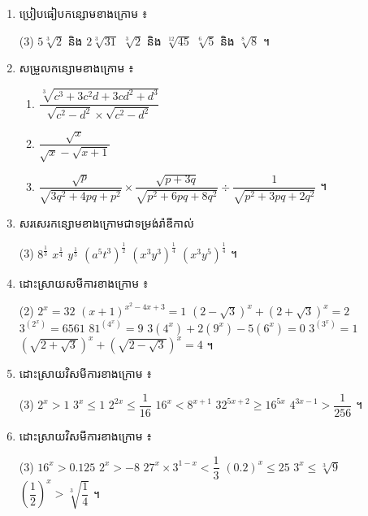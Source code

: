 \begin{enumerate}[1]
\begin{tasks}
  \end{tasks}
  \item ប្រៀបធៀបកន្សោមខាងក្រោម ៖
  \begin{tasks}(3)
    \task $5\sqrt[3]{2}$ និង $2\sqrt[3]{31}$
    \task $\sqrt[3]{2}$ និង $\sqrt[12]{45}$
    \task $\sqrt[6]{5}$ និង $\sqrt[8]{8}$ ។
  \end{tasks}
  \item សម្រួលកន្សោមខាងក្រោម ៖
  \begin{enumerate}[a]
    \item $\dfrac{\sqrt[3]{c^3 + 3c^2d + 3cd^2 + d^3}}{\sqrt{c^2 - d^2} \times \sqrt{c^2 - d^2}}$
    \item $\dfrac{\sqrt{x}}{\sqrt{x} - \sqrt{x + 1}}$
    \item $\dfrac{\sqrt{p}}{\sqrt{3q^2 + 4pq + p^2}} \times \dfrac{\sqrt{p + 3q}}{\sqrt{p^2 + 6pq + 8q^2}} \div \dfrac{1}{\sqrt{p^2 + 3pq + 2q^2}}$ ។
  \end{enumerate}
  \item សរសេរកន្សោមខាងក្រោមជាទម្រង់រ៉ាឌីកាល់
  \begin{tasks}(3)
    \task $8^{\frac{1}{3}}$
    \task $x^{\frac{1}{4}}$
    \task $y^{\frac{1}{5}}$
    \task $(a^5t^3)^{\frac{1}{2}}$
    \task $(x^3y^3)^{\frac{1}{4}}$
    \task $(x^3y^5)^{\frac{1}{4}}$ ។
  \end{tasks}
  \item ដោះស្រាយសមីការខាងក្រោម ៖
  \begin{tasks}(2)
    \task $2^x = 32$
    \task $(x + 1)^{x^2-4x+3} = 1$
    \task $(2 - \sqrt{3})^x + (2 + \sqrt{3})^x = 2$
    \task $3^{(2^x)} = 6561$
    \task $81^{(4^x)} = 9$
    \task $3(4^x) + 2(9^x) - 5(6^x) = 0$
    \task $3^{(3^x)} = 1$
    \task $\left(\sqrt{2 + \sqrt{3}}\right)^x + \left(\sqrt{2 - \sqrt{3}}\right)^x = 4$ ។
  \end{tasks}
  \item ដោះស្រាយវិសមីការខាងក្រោម ៖
  \begin{tasks}(3)
    \task $2^x > 1$
    \task $3^x \le 1$
    \task $2^{2x} \le \dfrac{1}{16}$
    \task $16^x < 8^{x+1}$
    \task $32^{5x+2} \ge 16^{5x}$
    \task $4^{3x-1} > \dfrac{1}{256}$ ។
  \end{tasks}
  \item ដោះស្រាយវិសមីការខាងក្រោម ៖
  \begin{tasks}(3)
    \task $16^x > 0.125$
    \task $2^x > -8$
    \task $27^x \times 3^{1-x} < \dfrac{1}{3}$
    \task $(0.2)^x \le 25$
    \task $3^x \le \sqrt[3]{9}$
    \task $\left(\dfrac{1}{2}\right)^x > \sqrt[3]{\dfrac{1}{4}}$ ។

\end{tasks}
\end{enumerate}
